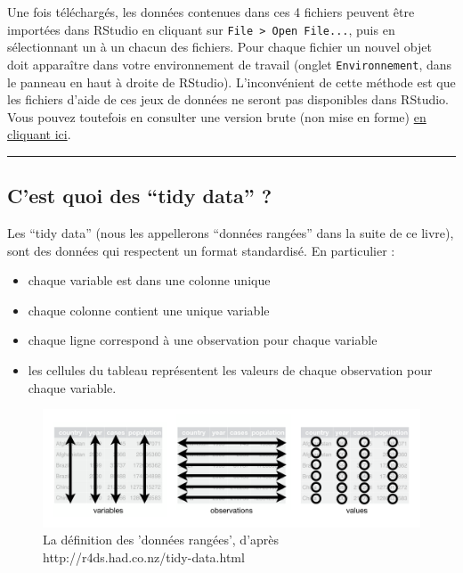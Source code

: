 \documentclass[a4paperpaper,]{article}
\providecommand{\tightlist}{%
  \setlength{\itemsep}{0pt}\setlength{\parskip}{0pt}}
\theoremstyle{definition}
\theoremstyle{definition}
\theoremstyle{definition}
\theoremstyle{remark}
\begin{document}
Une fois téléchargés, les données contenues dans ces 4 fichiers peuvent
être importées dans RStudio en cliquant sur
\texttt{File\ \textgreater{}\ Open\ File...}, puis en sélectionnant un à
un chacun des fichiers. Pour chaque fichier un nouvel objet doit
apparaître dans votre environnement de travail (onglet
\texttt{Environnement}, dans le panneau en haut à droite de RStudio).
L'inconvénient de cette méthode est que les fichiers d'aide de ces jeux
de données ne seront pas disponibles dans RStudio. Vous pouvez toutefois
en consulter une version brute (non mise en forme)
\href{https://github.com/rstudio/EDAWR/tree/master/man}{en cliquant
ici}.

\begin{center}\rule{0.5\linewidth}{\linethickness}\end{center}

\subsection{\texorpdfstring{C'est quoi des ``tidy data''
?}{C'est quoi des tidy data ?}}\label{cest-quoi-des-tidy-data}

Les ``tidy data'' (nous les appellerons ``données rangées'' dans la
suite de ce livre), sont des données qui respectent un format
standardisé. En particulier :

\begin{itemize}
\tightlist
\item
  chaque variable est dans une colonne unique
\item
  chaque colonne contient une unique variable
\item
  chaque ligne correspond à une observation pour chaque variable
\item
  les cellules du tableau représentent les valeurs de chaque observation
  pour chaque variable.
\end{itemize}

\begin{figure}[htpb]

{\centering \includegraphics[width=0.9\linewidth]{images/tidy} 

}

\caption{La définition des 'données rangées', d'après http://r4ds.had.co.nz/tidy-data.html}\label{fig:tidyschema}
\end{figure}
\end{document}
